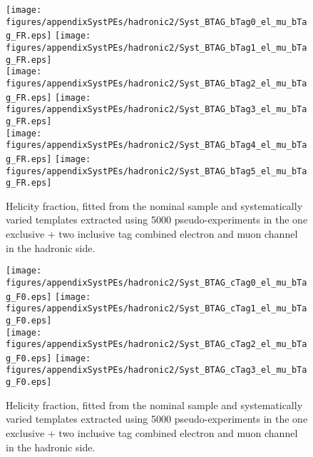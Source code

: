 \begin{figure}[!hb]
\begin{center}
        \texttt{[image: figures/appendixSystPEs/hadronic2/Syst\_BTAG\_bTag0\_el\_mu\_bTag\_FR.eps]}
        \texttt{[image: figures/appendixSystPEs/hadronic2/Syst\_BTAG\_bTag1\_el\_mu\_bTag\_FR.eps]}\\
        \texttt{[image: figures/appendixSystPEs/hadronic2/Syst\_BTAG\_bTag2\_el\_mu\_bTag\_FR.eps]}
        \texttt{[image: figures/appendixSystPEs/hadronic2/Syst\_BTAG\_bTag3\_el\_mu\_bTag\_FR.eps]}\\
        \texttt{[image: figures/appendixSystPEs/hadronic2/Syst\_BTAG\_bTag4\_el\_mu\_bTag\_FR.eps]}
        \texttt{[image: figures/appendixSystPEs/hadronic2/Syst\_BTAG\_bTag5\_el\_mu\_bTag\_FR.eps]}
        
\caption{Helicity fraction, \fr fitted from the nominal \ttbar sample and systematically varied templates extracted using 5000 pseudo-experiments in the one exclusive + two inclusive \bt tag combined electron and muon channel in the hadronic side. }
\label{fig:systematicVar_lep_fR_elmu2incl_btag1}
\end{center}
\end{figure}

\begin{figure}[!hb]
\begin{center}
        \texttt{[image: figures/appendixSystPEs/hadronic2/Syst\_BTAG\_cTag0\_el\_mu\_bTag\_F0.eps]}
        \texttt{[image: figures/appendixSystPEs/hadronic2/Syst\_BTAG\_cTag1\_el\_mu\_bTag\_F0.eps]}\\
        \texttt{[image: figures/appendixSystPEs/hadronic2/Syst\_BTAG\_cTag2\_el\_mu\_bTag\_F0.eps]}
        \texttt{[image: figures/appendixSystPEs/hadronic2/Syst\_BTAG\_cTag3\_el\_mu\_bTag\_F0.eps]}
        
\caption{Helicity fraction, \fo fitted from the nominal \ttbar sample and systematically varied templates extracted using 5000 pseudo-experiments in the one exclusive + two inclusive \bt tag combined electron and muon channel in the hadronic side. }
\label{fig:systematicVar_lep_f0_elmu2incl_btag2}
\end{center}
\end{figure}

